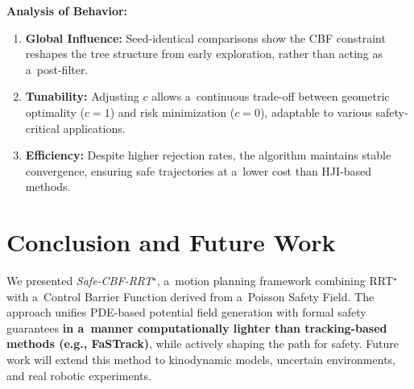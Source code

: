 \documentclass{svproc}
\begin{document}
\noindent \textbf{Analysis of Behavior:}
\begin{enumerate}
    \item \textbf{Global Influence:} Seed-identical comparisons show the CBF
    constraint reshapes the tree structure from early exploration, rather than
    acting as a~post-filter.
    \item \textbf{Tunability:} Adjusting $c$ allows a~continuous trade-off
    between geometric optimality ($c=1$) and risk minimization ($c=0$),
    adaptable to various safety-critical applications.
    \item \textbf{Efficiency:} Despite higher rejection rates, the algorithm
    maintains stable convergence, ensuring safe trajectories at a~lower
    cost than HJI-based methods.
\end{enumerate}

\section{Conclusion and Future Work}
We presented \emph{Safe-CBF-RRT$^\star$}, a~motion planning framework combining RRT$^\star$
with a~Control Barrier Function derived from a~Poisson Safety Field. The
approach unifies PDE-based potential field generation with formal safety
guarantees \textbf{in a~manner computationally lighter than tracking-based
methods (e.g., FaSTrack)}, while actively shaping the path for safety. Future
work will extend this method to kinodynamic models, uncertain
environments, and real robotic experiments.



\end{document}
